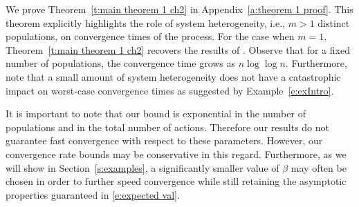 

%
%
%
%
%
%

We prove Theorem~\ref{t:main theorem 1 ch2} in Appendix~\ref{a:theorem 1 proof}.  This theorem explicitly highlights the role of system heterogeneity, i.e., $m>1$ distinct populations, on convergence times of the process.  For the case when $m=1$, Theorem~\ref{t:main theorem 1 ch2} recovers the results of \cite{Shah2010}.  Observe that for a fixed number of populations, the convergence time grows as $n\log\log n$.  Furthermore, note that a small amount of system heterogeneity does not have a catastrophic impact on worst-case convergence times as suggested by Example~\ref{e:exIntro}.

It is important to note that our bound is exponential in the number of populations and in the total number of actions. Therefore our results do not guarantee fast convergence with respect to these parameters. However, our convergence rate bounds may be conservative in this regard. Furthermore, as we will show in Section~\ref{s:examples}, a significantly smaller value of $\beta$ may often be chosen in order to further speed convergence while still retaining the asymptotic properties guaranteed in \eqref{e:expected val}. 


